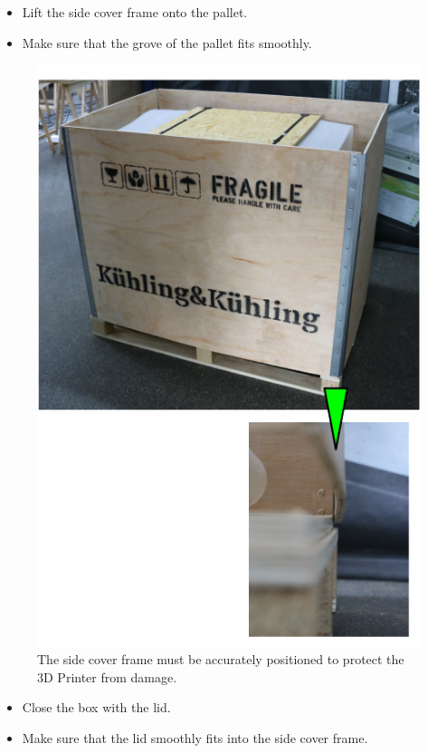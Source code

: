 \begin{itemize}
  \item Lift the side cover frame onto the pallet.
  \item Make sure that the grove of the pallet fits smoothly.
\end{itemize}

\begin{figure}[H]
  \centering
  \includegraphics[width=.7\linewidth]{./img/packstep6.png}
  \caption{The side cover frame must be accurately positioned to protect the 3D Printer from damage.}
\end{figure}

\begin{itemize}
  \item Close the box with the lid.
  \item Make sure that the lid smoothly fits into the side cover frame. 
\end{itemize}

